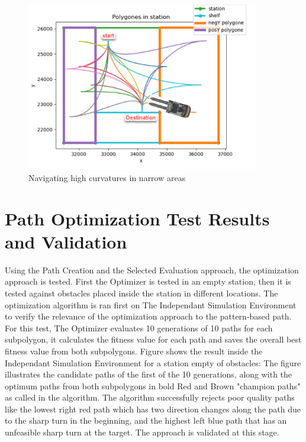 \begin{figure}[H]
    \begin{center}
        \includegraphics[width=4in]{images/Chap2/curv_problem.png} %
        \caption{Navigating high curvatures in narrow areas}
        \label{curv_problem}
        \end{center}    
\end{figure}

\section{Path Optimization Test Results and Validation}

Using the Path Creation and the Selected Evaluation approach, the optimization approach is tested.
First the Optimizer is tested in an empty station, then it is tested against obstacles placed inside the station 
in different locations. 
The optimization algorithm is ran first on The 
Independant Simulation Environment to verify the relevance of the optimization approach to the pattern-based 
path. 
For this test, The Optimizer evaluates 10 generations of 10 paths for each subpolygon, it calculates the fitness value 
for each path and saves the overall best fitness value from both subpolygons. 
Figure  shows the result inside the Independant Simulation Environment for a station empty of obstacles:
The figure illustrates the candidate paths of the first of the 10 generations, along with the optimum paths from 
both subpolygons in bold Red and Brown "champion paths" as called in the algorithm. 
The algorithm successfully rejects poor quality paths like the lowest right red path which has two direction changes 
along the path due to the sharp turn in the beginning, and the highest left blue path that 
has an unfeasible sharp turn at the target.
The approach is validated at this stage. 

